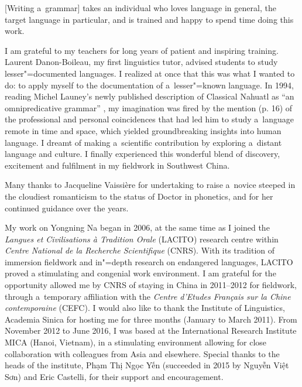 
\epigraph{[Writing a~grammar] takes an individual who loves language in general, the target language in particular, and is trained and happy to spend time doing this work.}{\citep[xxiv]{nurse2011}}

{\noindent}I am grateful to my teachers for long years of patient and inspiring training. Laurent Danon-Boileau, my first linguistics tutor, advised students to study lesser"=documented languages. 
I realized at once that this was what I wanted to do: to apply myself to the documentation of a~lesser"=known language. In 1994, reading Michel Launey’s newly published description of Classical Nahuatl as “an omnipredicative grammar” \citep{launey1994}, my imagination was fired by the mention (p. 16) of the professional and personal coincidences that had led him to study a~language remote in time and space, which yielded groundbreaking insights into human language. I dreamt of making a~scientific contribution by exploring a~distant language and culture. I finally experienced this wonderful blend of discovery, excitement and fulfilment in my fieldwork in Southwest China. 

Many thanks to Jacqueline Vaissière for undertaking to raise a~novice steeped in the cloudiest romanticism to the status of Doctor in phonetics, and for her continued guidance over the years. 

My work on Yongning Na began in 2006, at the same time as I joined the \textit{Langues et Civilisations à Tradition Orale} (LACITO) research centre within \textit{Centre National de la Recherche Scientifique} (CNRS). With its tradition of immersion fieldwork and in"=depth research on endangered languages, LACITO proved a stimulating and congenial work environment. I am grateful for the opportunity allowed me by CNRS of staying in China in 2011--2012 for fieldwork, through a~temporary
affiliation with the \textit{Centre d’Etudes Français sur la Chine contemporaine} (CEFC). I would also like to thank the Institute of Linguistics, Academia Sinica for hosting me for three months (January to March 2011). From November 2012 to June 2016, I was based at the International Research Institute MICA (Hanoi, Vietnam), in a stimulating environment allowing for close collaboration with colleagues from Asia and elsewhere. Special thanks to the heads of the institute, Phạm Thị Ngọc Yến (succeeded in 2015 by Nguyễn Việt Sơn) and Eric Castelli, for their support and encouragement.

